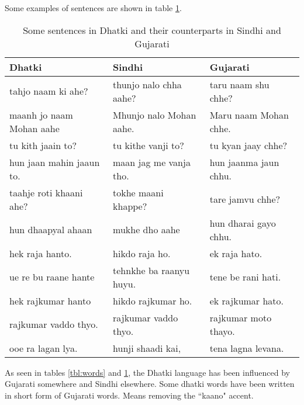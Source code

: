 Some examples of sentences are shown in table \ref{tbl:sent}.
\begin{table}
\begin{center}
\begin{tabular}{l|l|l}
\hline
\textbf{Dhatki} & \textbf{Sindhi} & \textbf{Gujarati} \\
\hline
tahjo naam ki ahe? & thunjo nalo chha aahe? & taru naam shu chhe? \\ 
maanh jo naam Mohan aahe & Mhunjo nalo Mohan aahe. & Maru naam Mohan chhe. \\ 
tu kith jaain to? & tu kithe vanji to? & tu kyan jaay chhe? \\ 
hun jaan mahin jaaun to. & maan jag me vanja tho. & hun jaanma jaun chhu. \\ 
taahje roti khaani ahe? & tokhe maani khappe? & tare jamvu chhe? \\ 
hun dhaapyal ahaan & mukhe dho aahe & hun dharai gayo chhu. \\ 
hek raja hanto. & hikdo raja ho. & ek raja hato. \\ 
ue re bu raane hante & tehnkhe ba raanyu huyu. & tene be rani hati. \\ 
hek rajkumar hanto & hikdo rajkumar ho. & ek rajkumar hato. \\ 
rajkumar vaddo thyo. & rajkumar vaddo thyo. & rajkumar moto thayo. \\ 
ooe ra lagan lya. & hunji shaadi kai, & tena lagna levana.\\
\hline
\end{tabular}
\end{center}
\caption{Some sentences in Dhatki and their counterparts in Sindhi and Gujarati}
\label{tbl:sent}
\end{table}
As seen in tables \ref{tbl:words} and \ref{tbl:sent}, the Dhatki language has
been influenced by Gujarati somewhere and Sindhi elsewhere. Some dhatki words
have been written in short form of Gujarati words. Means removing the ``kaano"
accent.

